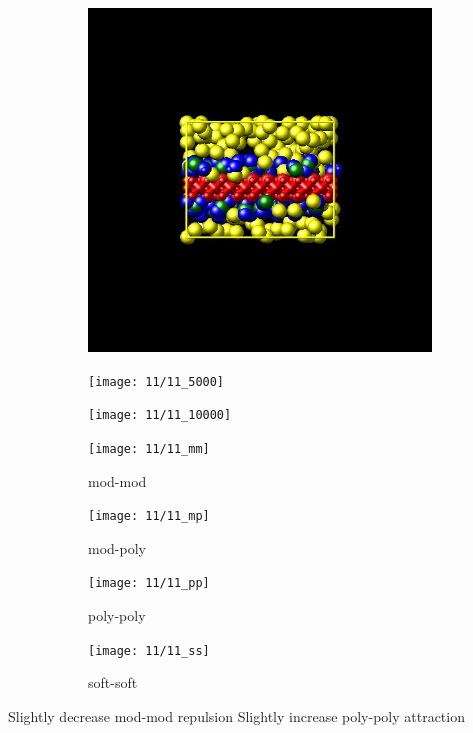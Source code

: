 \documentclass[a4paper]{article}
\begin{document}
\begin{figure}[H]
\begin{subfigure}{0.3\textwidth}
  \centering
  \includegraphics[width=\linewidth,keepaspectratio]{start}
  \caption{}
\end{subfigure}
\begin{subfigure}{0.3\textwidth}
  \centering
  \texttt{[image: 11/11\_5000]}
  \caption{}
\end{subfigure}
\begin{subfigure}{0.3\textwidth}
  \centering
  \texttt{[image: 11/11\_10000]}
  \caption{}
\end{subfigure}
\caption{}
\label{fig_1}
\end{figure}

\begin{figure}[H]
\begin{subfigure}{0.24\textwidth}
  \centering
  \texttt{[image: 11/11\_mm]}
  \caption{mod-mod}
\end{subfigure}
\begin{subfigure}{0.24\textwidth}
  \centering
  \texttt{[image: 11/11\_mp]}
  \caption{mod-poly}
\end{subfigure}
\begin{subfigure}{0.24\textwidth}
  \centering
  \texttt{[image: 11/11\_pp]}
  \caption{poly-poly}
\end{subfigure}
\begin{subfigure}{0.24\textwidth}
  \centering
  \texttt{[image: 11/11\_ss]}
  \caption{soft-soft}
\end{subfigure}
\caption{}
\label{fig_1}
\end{figure}
Slightly decrease mod-mod repulsion\newline
Slightly increase poly-poly attraction
\end{document}
